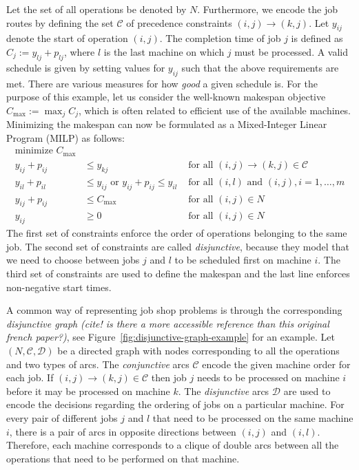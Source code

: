 \documentclass{article}
\theoremstyle{definition}
\theoremstyle{plain}
\begin{document}
Let the set of all operations be denoted by $N$. Furthermore, we encode the job
routes by defining the set $\mathcal{C}$ of precedence constraints
$(i,j) \xrightarrow{} (k,j)$. Let $y_{ij}$ denote the start of operation
$(i,j)$. The completion time of job $j$ is defined as
$C_{j} := y_{lj} + p_{lj}$, where $l$ is the last machine on which $j$ must be
processed. A valid schedule is given by setting values for $y_{ij}$ such that
the above requirements are met. There are various measures for how \textit{good}
a given schedule is. For the purpose of this example, let us consider the
well-known makespan objective $C_{\text{max}} := \max_{j} C_{j}$, which is often
related to efficient use of the available machines. Minimizing the makespan can
now be formulated as a Mixed-Integer Linear Program (MILP) as follows:
%
\begin{align*}
  \text{minimize } C_{\text{max}} \\
  y_{ij} + p_{ij} &\leq y_{kj}  & \text{ for all } (i,j) \xrightarrow{} (k,j) \in \mathcal{C} \\
  y_{il} + p_{il} &\leq  y_{ij} \text{ or } y_{ij} + p_{ij} \leq y_{il}  & \text{ for all } (i,l) \text{ and } (i,j), i =1, \dots,m \\
  y_{ij} + p_{ij} &\leq C_{\text{max}} & \text{ for all } (i,j) \in N \\
  y_{ij} &\geq 0 & \text{ for all } (i,j) \in N
\end{align*}
%
The first set of constraints enforce the order of operations belonging to the
same job. The second set of constraints are called \textit{disjunctive}, because
they model that we need to choose between jobs $j$ and $l$ to be scheduled first
on machine $i$. The third set of constraints are used to define the makespan and the
last line enforces non-negative start times.

A common way of representing job shop problems is through the corresponding
\textit{disjunctive graph} \textit{\color{blue}(cite! is there a more accessible
  reference than this original french paper?)}, see
Figure~\ref{fig:disjunctive-graph-example} for an example. Let
$(N, \mathcal{C}, \mathcal{D})$ be a directed graph with nodes corresponding to
all the operations and two types of arcs. The \textit{conjunctive} arcs
$\mathcal{C}$ encode the given machine order for each job. If
$(i,j) \rightarrow (k, j) \in \mathcal{C}$ then job $j$ needs to be processed on
machine $i$ before it may be processed on machine $k$. The \textit{disjunctive}
arcs $\mathcal{D}$ are used to encode the decisions regarding the ordering of
jobs on a particular machine. For every pair of different jobs $j$ and $l$ that
need to be processed on the same machine $i$, there is a pair of arcs in
opposite directions between $(i,j)$ and $(i,l)$. Therefore, each machine
corresponds to a clique of double arcs between all the operations that need to
be performed on that machine.
\end{document}
